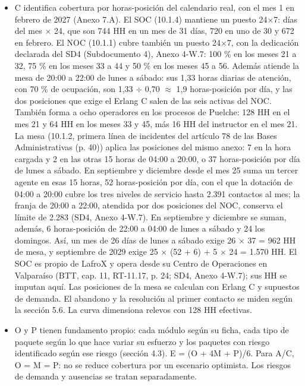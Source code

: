 \begin{itemize}
\item C identifica cobertura por horas-posición del calendario real, con el mes 1 en febrero de 2027 (Anexo 7.A). El SOC (10.1.4) mantiene un puesto 24\ensuremath{\times}7: días del mes \ensuremath{\times} 24, que son 744 HH en un mes de 31 días, 720 en uno de 30 y 672 en febrero. El NOC (10.1.1) cubre también un puesto 24\ensuremath{\times}7, con la dedicación declarada del SD4 (Subdocumento 4), Anexo 4-W.7: 100 \% en los meses 21 a 32, 75 \% en los meses 33 a 44 y 50 \% en los meses 45 a 56. Además atiende la mesa de 20:00 a 22:00 de lunes a sábado: sus 1,33 horas diarias de atención, con 70 \% de ocupación, son 1,33 \ensuremath{\div} 0,70 \ensuremath{\approx} 1,9 horas-posición por día, y las dos posiciones que exige el Erlang C salen de las seis activas del NOC. También forma a ocho operadores en los procesos de Puelche: 128 HH en el mes 21 y 64 HH en los meses 33 y 45, más 16 HH del instructor en el mes 21. La mesa (10.1.2, primera línea de incidentes del artículo 78 de las Bases Administrativas (p. 40)) aplica las posiciones del mismo anexo: 7 en la hora cargada y 2 en las otras 15 horas de 04:00 a 20:00, o 37 horas-posición por día de lunes a sábado. En septiembre y diciembre desde el mes 25 suma un tercer agente en esas 15 horas, 52 horas-posición por día, con el que la dotación de 04:00 a 20:00 cubre los tres niveles de servicio hasta 2.391 contactos al mes; la franja de 20:00 a 22:00, atendida por dos posiciones del NOC, conserva el límite de 2.283 (SD4, Anexo 4-W.7). En septiembre y diciembre se suman, además, 6 horas-posición de 22:00 a 04:00 de lunes a sábado y 24 los domingos. Así, un mes de 26 días de lunes a sábado exige 26 \ensuremath{\times} 37 = 962 HH de mesa, y septiembre de 2029 exige 25 \ensuremath{\times} (52 + 6) + 5 \ensuremath{\times} 24 = 1.570 HH. El SOC es propio de LafroX y opera desde su Centro de Operaciones en Valparaíso (BTT, cap. 11, RT-11.17, p. 24; SD4, Anexo 4-W.7); sus HH se imputan aquí. Las posiciones de la mesa se calculan con Erlang C y supuestos de demanda. El abandono y la resolución al primer contacto se miden según la sección 5.6. La curva dimensiona relevos con 128 HH efectivas.
\item O y P tienen fundamento propio: cada módulo según su ficha, cada tipo de paquete según lo que hace variar su esfuerzo y los paquetes con riesgo identificado según ese riesgo (sección 4.3). E = (O + 4M + P)/6. Para A/C, O = M = P: no se reduce cobertura por un escenario optimista. Los riesgos de demanda y ausencias se tratan separadamente.

\end{itemize}
